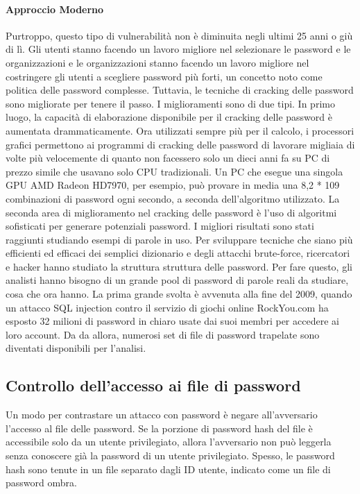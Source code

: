 \paragraph{Approccio Moderno}
Purtroppo, questo tipo di vulnerabilità non è diminuita negli ultimi 25 anni o giù di lì. Gli utenti stanno facendo un lavoro migliore nel selezionare le password e le organizzazioni e le organizzazioni stanno facendo un lavoro migliore nel costringere gli utenti a scegliere password più forti, un concetto noto come politica delle password complesse. Tuttavia, le tecniche di cracking delle password sono migliorate per tenere il passo. I miglioramenti sono di due tipi. In primo luogo, la capacità di elaborazione disponibile per il cracking delle password è aumentata drammaticamente. Ora utilizzati sempre più per il calcolo, i processori grafici permettono ai programmi di cracking delle password di lavorare migliaia di volte più velocemente di quanto non facessero solo un dieci anni fa su PC di prezzo simile che usavano solo CPU tradizionali. Un PC che esegue una singola GPU AMD Radeon HD7970, per esempio, può provare in media una 8,2 * 109 combinazioni di password ogni secondo, a seconda dell'algoritmo utilizzato.
\singlespacing
La seconda area di miglioramento nel cracking delle password è l'uso di algoritmi sofisticati per generare potenziali password. I migliori risultati sono stati raggiunti studiando esempi di parole in uso. Per sviluppare tecniche che siano più efficienti ed efficaci dei semplici dizionario e degli attacchi brute-force, ricercatori e hacker hanno studiato la struttura struttura delle password. Per fare questo, gli analisti hanno bisogno di un grande pool di password di parole reali da studiare, cosa che ora hanno. La prima grande svolta è avvenuta alla fine del 2009, quando un attacco SQL injection contro il servizio di giochi online RockYou.com ha esposto 32 milioni di password in chiaro usate dai suoi membri per accedere ai loro account. Da da allora, numerosi set di file di password trapelate sono diventati disponibili per l'analisi.
\newpage
\subsection{Controllo dell'accesso ai file di password}
Un modo per contrastare un attacco con password è negare all'avversario l'accesso al file delle password. Se la porzione di password hash del file è accessibile solo da un utente privilegiato, allora l'avversario non può leggerla senza conoscere già la password di un utente privilegiato. Spesso, le password hash sono tenute in un file separato dagli ID utente, indicato come un file di password ombra.

